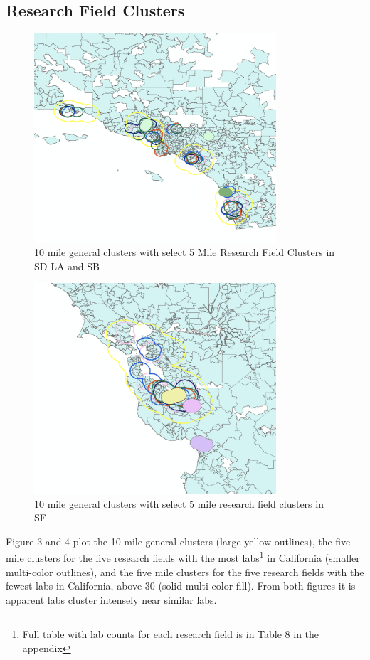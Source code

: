 \documentclass[12pt,letterpaper]{article}
\begin{document}
\subsection{Research Field Clusters}
\begin{figure}[H]
    \centering
    \includegraphics[width=9cm]{RLA.png}
    \caption{10 mile general clusters with select 5 Mile Research Field Clusters in SD LA and SB}
    \label{fig:my_label}
\end{figure}
\begin{figure}[H]
    \centering
    \includegraphics[width=9cm]{RSF.png}
    \caption{10 mile general clusters with select 5 mile research field clusters in SF}
    \label{fig:my_label}
\end{figure}
\par 
Figure 3 and 4 plot the 10 mile general clusters (large yellow outlines), the five mile clusters for the five research fields with the most labs\footnote{Full table with lab counts for each research field is in Table 8 in the appendix} in California (smaller multi-color outlines), and the five mile clusters for the five research fields with the fewest labs in California, above 30 (solid multi-color fill). From both figures it is apparent labs cluster intensely near similar labs. 
\end{document}
